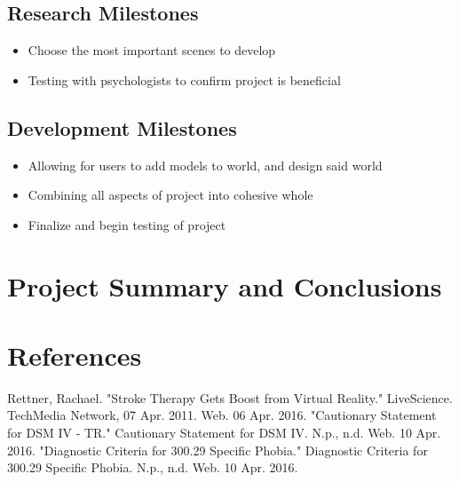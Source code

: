 \documentclass[a4paper,10pt]{article}
\begin{document}
	\subsection{Research Milestones}
		\begin{itemize}
			\item Choose the most important scenes to develop
			\item Testing with psychologists to confirm project is beneficial
		\end{itemize}
	\subsection{Development Milestones}
		\begin{itemize}
			\item Allowing for users to add models to world, and design said world
			\item Combining all aspects of project into cohesive whole
			\item Finalize and begin testing of project
		\end{itemize}
	

\pagebreak
\section{Project Summary and Conclusions}

\pagebreak
{}
\setcounter{page}{1}
\section{References}


\begin{thebibliography}{9}
Rettner, Rachael. "Stroke Therapy Gets Boost from Virtual Reality." LiveScience. TechMedia Network, 07 Apr. 2011. Web. 06 Apr. 2016.
"Cautionary Statement for DSM IV - TR." Cautionary Statement for DSM IV. N.p., n.d. Web. 10 Apr. 2016.
"Diagnostic Criteria for 300.29 Specific Phobia." Diagnostic Criteria for 300.29 Specific Phobia. N.p., n.d. Web. 10 Apr. 2016.
\end{thebibliography}
\end{document}
